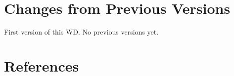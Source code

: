 \documentclass[11pt,a4paper]{ivoa}
\begin{document}
\section{Changes from Previous Versions}

First version of this WD. 
No previous versions yet.


\section{References}

 
\end{document}
